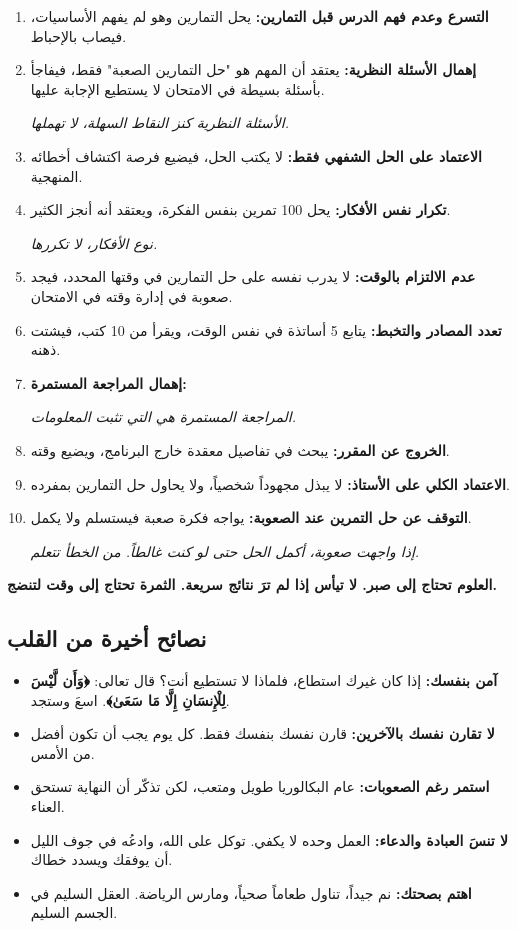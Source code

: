\documentclass[12pt,a4paper]{book}
\newcommand{\quoteAr}[1]{%
	\begin{myquote}
		\itshape #1
	\end{myquote}
}
\newcommand{\importantAr}[1]{%
	\begin{important}
		\bfseries #1
	\end{important}
}
\begin{document}
	\begin{enumerate}
		\item \textbf{التسرع وعدم فهم الدرس قبل التمارين:} يحل التمارين وهو لم يفهم الأساسيات، فيصاب بالإحباط.
		\item \textbf{إهمال الأسئلة النظرية:} يعتقد أن المهم هو "حل التمارين الصعبة" فقط، فيفاجأ بأسئلة بسيطة في الامتحان لا يستطيع الإجابة عليها. \quoteAr{الأسئلة النظرية كنز النقاط السهلة، لا تهملها.}
		\item \textbf{الاعتماد على الحل الشفهي فقط:} لا يكتب الحل، فيضيع فرصة اكتشاف أخطائه المنهجية.
		\item \textbf{تكرار نفس الأفكار:} يحل 100 تمرين بنفس الفكرة، ويعتقد أنه أنجز الكثير. \quoteAr{نوع الأفكار، لا تكررها.}
		\item \textbf{عدم الالتزام بالوقت:} لا يدرب نفسه على حل التمارين في وقتها المحدد، فيجد صعوبة في إدارة وقته في الامتحان.
		\item \textbf{تعدد المصادر والتخبط:} يتابع 5 أساتذة في نفس الوقت، ويقرأ من 10 كتب، فيشتت ذهنه.
		\item \textbf{إهمال المراجعة المستمرة:}  \quoteAr{المراجعة المستمرة هي التي تثبت المعلومات.}
		\item \textbf{الخروج عن المقرر:} يبحث في تفاصيل معقدة خارج البرنامج، ويضيع وقته.
		\item \textbf{الاعتماد الكلي على الأستاذ:} لا يبذل مجهوداً شخصياً، ولا يحاول حل التمارين بمفرده.
		\item \textbf{التوقف عن حل التمرين عند الصعوبة:} يواجه فكرة صعبة فيستسلم ولا يكمل. \quoteAr{إذا واجهت صعوبة، أكمل الحل حتى لو كنت غالطاً. من الخطأ تتعلم.}
	\end{enumerate}
	
	\importantAr{العلوم تحتاج إلى صبر. لا تيأس إذا لم ترَ نتائج سريعة. الثمرة تحتاج إلى وقت لتنضج.}
	
	\subsection{نصائح أخيرة من القلب}
	\label{sec:random-tips10}
	\begin{itemize}
		\item \textbf{آمن بنفسك:} إذا كان غيرك استطاع، فلماذا لا تستطيع أنت؟ قال تعالى: \textbf{﴿وَأَن لَّيْسَ لِلْإِنسَانِ إِلَّا مَا سَعَىٰ﴾}. اسعَ وستجد.
		\item \textbf{لا تقارن نفسك بالآخرين:} قارن نفسك بنفسك فقط. كل يوم يجب أن تكون أفضل من الأمس.
		\item \textbf{استمر رغم الصعوبات:} عام البكالوريا طويل ومتعب، لكن تذكّر أن النهاية تستحق العناء.
		\item \textbf{لا تنسَ العبادة والدعاء:} العمل وحده لا يكفي. توكل على الله، وادعُه في جوف الليل أن يوفقك ويسدد خطاك.
		\item \textbf{اهتم بصحتك:} نم جيداً، تناول طعاماً صحياً، ومارس الرياضة. العقل السليم في الجسم السليم.
	\end{itemize}
	
\end{document}
